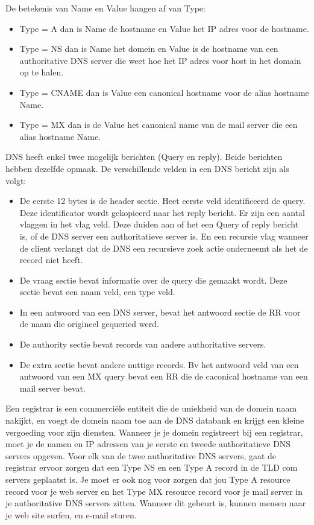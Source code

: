 De betekenis van Name en Value hangen af van Type:
\begin{itemize}
   \item Type = A dan is Name de hostname en Value het IP adres voor de hostname.
 \item Type = NS dan is Name het domein en Value is de hostname van een authoritative DNS server die weet hoe het IP adres voor host in het domain op te halen.
 \item Type = CNAME dan is Value een canonical hostname voor de alias hostname Name.
 \item Type = MX dan is de Value het canonical name van de mail server die een alias hostname Name.
\end{itemize}



DNS heeft enkel twee mogelijk berichten (Query en reply). Beide berichten hebben dezelfde opmaak. De verschillende velden in een DNS bericht zijn als volgt:
\begin{itemize}
   \item De eerste 12 bytes is de header sectie. Heet eerste veld identificeerd de query. Deze identificator wordt gekopieerd naar het reply bericht. Er zijn een aantal vlaggen in het vlag veld. Deze duiden aan of het een Query of reply bericht is, of de DNS server een authoritatieve server is. En een recursie vlag wanneer de client verlangt dat de DNS een recursieve zoek actie onderneemt als het de record niet heeft.
\item De vraag sectie bevat informatie over de query die gemaakt wordt. Deze sectie bevat een naam veld, een type veld.
\item In een antwoord van een DNS server, bevat het antwoord sectie de RR voor de naam die origineel gequeried werd.
\item De authority sectie bevat records van andere authoritative servers.
\item De extra sectie bevat andere nuttige records. Bv het antwoord veld van een antwoord van een MX query bevat een RR die de caconical hostname van een mail server bevat.
\end{itemize}


\clearpage


Een registrar is een commerciële entiteit die de uniekheid van de domein naam nakijkt, en voegt de domein naam toe aan de DNS databank en krijgt een kleine vergoeding voor zijn diensten. Wanneer je je domein registreert bij een registrar, moet je de namen en IP adressen van je eerste en tweede authoritatieve DNS servers opgeven. Voor elk van de twee authoritative DNS servers, gaat de registrar ervoor zorgen dat een Type NS en een Type A record in de TLD com servers geplaatst is. Je moet er ook nog voor zorgen dat jou Type A resource record voor je web server en het Type MX resource record voor je mail server in je authoritative DNS servers zitten.
Wanneer dit gebeurt is, kunnen mensen naar je web site surfen, en e-mail sturen.
